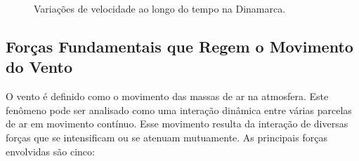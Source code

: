 \begin{figure}[H]
    \caption{Variações de velocidade ao longo do tempo na Dinamarca.}      
    \centering
    \label{fig:velocidade ao longo do tempo}
    \hspace{0.05\textwidth}
    
\end{figure}

 \subsection{Forças Fundamentais que Regem o Movimento do Vento}
 \par O vento é definido como o movimento das massas de ar na atmosfera. Este fenômeno pode ser analisado como uma interação dinâmica entre várias parcelas de ar em movimento contínuo. Esse movimento resulta da interação de diversas forças que se intensificam ou se atenuam mutuamente. As principais forças envolvidas são cinco:

